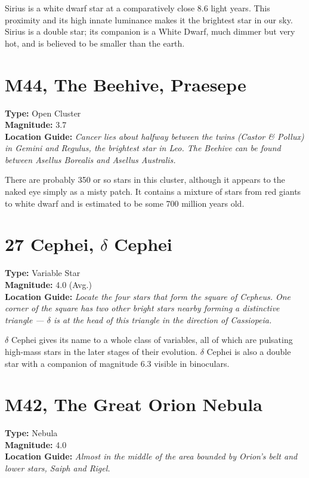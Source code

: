 Sirius is a white dwarf star at a comparatively close 8.6 light
years. This proximity and its high innate luminance makes it the
brightest star in our sky. Sirius is a double star; its companion is a White Dwarf, much dimmer but very hot, and is believed to be smaller than the earth.

\section{M44, The Beehive, Praesepe}
\textbf{Type:} Open Cluster \\
\textbf{Magnitude:} 3.7 \\
\textbf{Location Guide:} \textit{Cancer lies about halfway between the
  twins (Castor \& Pollux) in Gemini and Regulus, the brightest star
  in Leo. The Beehive can be found between Asellus Borealis and
  Asellus Australis.}

There are probably 350 or so stars in this cluster, although it appears
to the naked eye simply as a misty patch. It contains a mixture of
stars from red giants to white dwarf and is estimated to be some 700
million years old.

\section{27 Cephei, \texorpdfstring{$\delta$}{delta} Cephei} 
\textbf{Type:} Variable Star \\
\textbf{Magnitude:} 4.0 (Avg.) \\
\textbf{Location Guide:} \textit{Locate the four stars that form the
  square of Cepheus. One corner of the square has two other bright
  stars nearby forming a distinctive triangle --- $\delta$ is at the
  head of this triangle in the direction of Cassiopeia.}

$\delta$ Cephei gives its name to a whole class of variables, all of
which are pulsating high-mass stars in the later stages of their
evolution. $\delta$ Cephei is also a double star with a companion of
magnitude 6.3 visible in binoculars.

\section{M42, The Great Orion Nebula} 
\textbf{Type:} Nebula \\
\textbf{Magnitude:} 4.0 \\
\textbf{Location Guide:} \textit{Almost in the middle of the area bounded by Orion's belt and lower stars, Saiph and Rigel.} 


